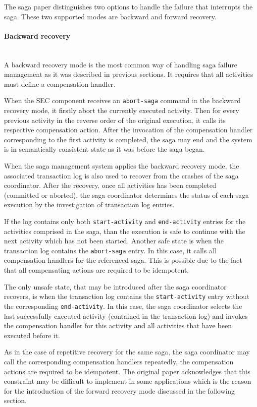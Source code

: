 \documentclass[oneside,
  digital, %
  table,   %
  nolof,     %
  nolot,     %
]{fithesis3}
\newcommand{\newlinepar}[1]{\paragraph{#1}\needspace{4\baselineskip}\mbox{}\\}
\begin{document}
The saga paper \cite{sagas_publ} distinguishes two options to handle the failure that interrupts the saga. These two supported modes are backward and forward recovery.

\newlinepar{Backward recovery}

A backward recovery mode is the most common way of handling saga failure management as it was described in previous sections. It requires that all activities must define a compensation handler.

When the SEC component receives an \texttt{abort-saga} command in the backward recovery mode, it firstly abort the currently executed activity. Then for every previous activity in the reverse order of the original execution, it calls its respective compensation action. After the invocation of the compensation handler corresponding to the first activity is completed, the saga may end and the system is in semantically consistent state as it was before the saga began.

When the saga management system applies the backward recovery mode, the associated transaction log is also used to recover from the crashes of the saga coordinator. After the recovery, once all activities has been completed (committed or aborted), the saga coordinator determines the status of each saga execution by the investigation of transaction log entries. 

If the log contains only both \texttt{start-activity} and \texttt{end-activity} entries for the activities comprised in the saga,  than the execution is safe to continue with the next activity which has not been started. Another safe state is when the transaction log contains the \texttt{abort-saga} entry. In this case, it calls all compensation handlers for the referenced saga. This is possible due to the fact that all compensating actions are required to be idempotent.

The only unsafe state, that may be introduced after the saga coordinator recovers, is when the transaction log contains the \texttt{start-activity} entry without the corresponding \texttt{end-activity}. In this case, the saga coordinator selects the last successfully executed activity (contained in the transaction log) and invokes the compensation handler for this activity and all activities that have been executed before it.

As in the case of repetitive recovery for the same saga, the saga coordinator may call the corresponding compensation handlers repeatedly, the compensation actions are required to be idempotent. The original paper acknowledges that this constraint may be difficult to implement in some applications which is the reason for the introduction of the forward recovery mode discussed in the following section.
\end{document}
